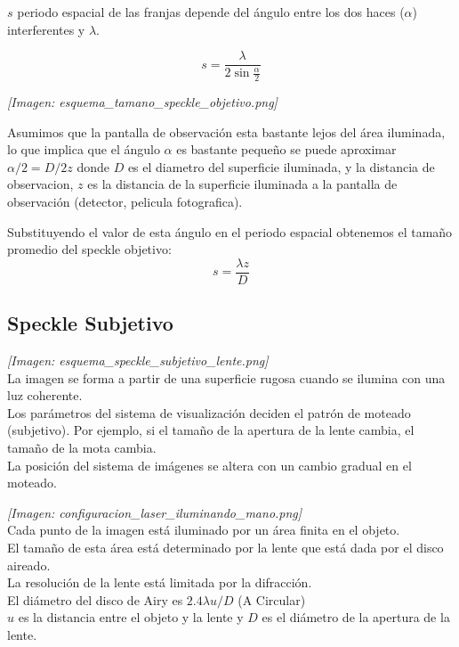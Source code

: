 \documentclass[12pt]{article}
\begin{document}
	$s$ periodo espacial de las franjas depende del ángulo entre los dos haces ($\alpha$) interferentes y $\lambda$.
	
	\begin{minipage}{0.3\textwidth}
		\begin{equation*}
			s = \frac{\lambda}{2\sin\frac{\alpha}{2}}
		\end{equation*}
	\end{minipage}
	\hfill
	\begin{minipage}{0.65\textwidth}
		\textit{[Imagen: esquema\_tamano\_speckle\_objetivo.png]}
	\end{minipage}
	
	\vspace{0.3cm}
	Asumimos que la pantalla de observación esta bastante lejos del área iluminada, lo que implica que el ángulo $\alpha$ es bastante pequeño se puede aproximar $\alpha/2 = D/2z$ donde $D$ es el diametro del superficie iluminada, y la distancia de observacion, $z$ es la distancia de la superficie iluminada a la pantalla de observación (detector, pelicula fotografica).
	
	Substituyendo el valor de esta ángulo en el periodo espacial obtenemos el tamaño promedio del speckle objetivo:
	\begin{equation*}
		s = \frac{\lambda z}{D}
	\end{equation*}
	
	\subsection{Speckle Subjetivo}
	\begin{minipage}{0.45\textwidth}
		\textit{[Imagen: esquema\_speckle\_subjetivo\_lente.png]} \\
		
		La imagen se forma a partir de una superficie rugosa cuando se ilumina con una luz coherente. \\
		Los parámetros del sistema de visualización deciden el patrón de moteado (subjetivo). Por ejemplo, si el tamaño de la apertura de la lente cambia, el tamaño de la mota cambia. \\
		La posición del sistema de imágenes se altera con un cambio gradual en el moteado.
	\end{minipage}
	\hfill
	\begin{minipage}{0.5\textwidth}
		\textit{[Imagen: configuracion\_laser\_iluminando\_mano.png]} \\
		
		Cada punto de la imagen está iluminado por un área finita en el objeto. \\
		El tamaño de esta área está determinado por la lente que está dada por el disco aireado. \\
		La resolución de la lente está limitada por la difracción. \\
		El diámetro del disco de Airy es $2.4 \lambda u / D$ (A Circular) \\
		$u$ es la distancia entre el objeto y la lente y $D$ es el diámetro de la apertura de la lente.
	\end{minipage}
	
\end{document}
